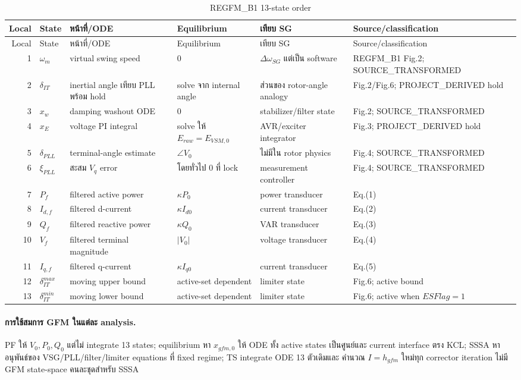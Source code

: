 \documentclass[12pt,a4paper]{article}
\begin{document}
\small
\begin{longtable}{r p{} p{} p{} p{} p{}}
\caption{REGFM\_B1 13-state order}\label{tab:gfm-states}\\
\toprule
Local & State & หน้าที่/ODE & Equilibrium & เทียบ SG & Source/classification \\\midrule
\endfirsthead
\toprule Local & State & หน้าที่/ODE & Equilibrium & เทียบ SG & Source/classification \\\midrule
\endhead
1 & $\omega_m$ & virtual swing speed & $0$ & $\Delta\omega_{SG}$ แต่เป็น software & REGFM\_B1 Fig.2; SOURCE\_TRANSFORMED \\
2 & $\delta_{IT}$ & inertial angle เทียบ PLL พร้อม hold & solve จาก internal angle & ส่วนของ rotor-angle analogy & Fig.2/Fig.6; PROJECT\_DERIVED hold \\
3 & $x_w$ & damping washout ODE & $0$ & stabilizer/filter state & Fig.2; SOURCE\_TRANSFORMED \\
4 & $x_E$ & voltage PI integral & solve ให้ $E_{raw}=E_{VSM,0}$ & AVR/exciter integrator & Fig.3; PROJECT\_DERIVED hold \\
5 & $\delta_{PLL}$ & terminal-angle estimate & $\angle V_0$ & ไม่มีใน rotor physics & Fig.4; SOURCE\_TRANSFORMED \\
6 & $\xi_{PLL}$ & สะสม $V_q$ error & โดยทั่วไป $0$ ที่ lock & measurement controller & Fig.4; SOURCE\_TRANSFORMED \\
7 & $P_f$ & filtered active power & $\kappa P_0$ & power transducer & Eq.(1) \\
8 & $I_{d,f}$ & filtered d-current & $\kappa I_{d0}$ & current transducer & Eq.(2) \\
9 & $Q_f$ & filtered reactive power & $\kappa Q_0$ & VAR transducer & Eq.(3) \\
10 & $V_f$ & filtered terminal magnitude & $|V_0|$ & voltage transducer & Eq.(4) \\
11 & $I_{q,f}$ & filtered q-current & $\kappa I_{q0}$ & current transducer & Eq.(5) \\
12 & $\delta_{IT}^{max}$ & moving upper bound & active-set dependent & limiter state & Fig.6; active bound \\
13 & $\delta_{IT}^{min}$ & moving lower bound & active-set dependent & limiter state & Fig.6; active when $ESFlag=1$ \\
\bottomrule
\end{longtable}
\normalsize

\paragraph{การใช้สมการ GFM ในแต่ละ analysis.}
PF ให้ $V_0,P_0,Q_0$ แต่ไม่ integrate 13 states; equilibrium หา $x_{gfm,0}$ ให้
ODE ทั้ง active states เป็นศูนย์และ current interface ตรง KCL; SSSA หาอนุพันธ์ของ
VSG/PLL/filter/limiter equations ที่ fixed regime; TS integrate ODE 13 ตัวเดิมและ
คำนวณ $I=h_{gfm}$ ใหม่ทุก corrector iteration ไม่มี GFM state-space คนละชุดสำหรับ SSSA
\end{document}
